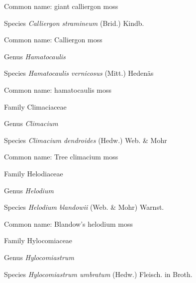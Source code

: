 \documentclass[9pt, article]{memoir}
\begin{document}
\begin{multicols}{2}
Common name: giant calliergon moss

\vspace{6pt}\noindent\hspace{36pt}Species \textit{Calliergon stramineum} (Brid.) Kindb.


Common name: Calliergon moss

\vspace{6pt}\noindent\hspace{30pt}Genus \textit{Hamatocaulis}


\vspace{6pt}\noindent\hspace{36pt}Species \textit{Hamatocaulis vernicosus} (Mitt.) Hedenäs


Common name: hamatocaulis moss

\vspace{6pt}\noindent\hspace{24pt}Family Climaciaceae


\vspace{6pt}\noindent\hspace{30pt}Genus \textit{Climacium}


\vspace{6pt}\noindent\hspace{36pt}Species \textit{Climacium dendroides} (Hedw.) Web. \& Mohr


Common name: Tree climacium moss

\vspace{6pt}\noindent\hspace{24pt}Family Helodiaceae


\vspace{6pt}\noindent\hspace{30pt}Genus \textit{Helodium}


\vspace{6pt}\noindent\hspace{36pt}Species \textit{Helodium blandowii} (Web. \& Mohr) Warnst.


Common name: Blandow's helodium moss

\vspace{6pt}\noindent\hspace{24pt}Family Hylocomiaceae


\vspace{6pt}\noindent\hspace{30pt}Genus \textit{Hylocomiastrum}


\vspace{6pt}\noindent\hspace{36pt}Species \textit{Hylocomiastrum umbratum} (Hedw.) Fleisch. in Broth.



\end{multicols}
\end{document}
